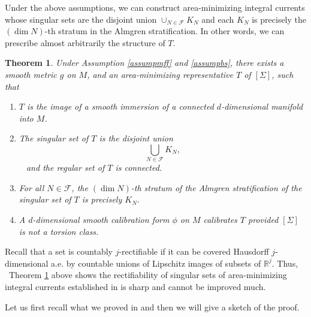 \documentclass[11pt,a4paper]{amsart}
\numberwithin{equation}{section}
\newcommand{\mff}{\mathcal{F}}
\newcommand{\Si}{\Sigma}
\newcommand{\R}{\mathbb{R}}
\theoremstyle{plain}
\newtheorem{thm}{Theorem}
\theoremstyle{definition}
\numberwithin{equation}{subsection}
\begin{document}
	Under the above assumptions, we can construct area-minimizing integral currents whose singular sets are the disjoint union $\cup_{N\in \mff}K_N$ and each $K_N$ is precisely the $(\dim N)$-th stratum in the Almgren stratification. In other words, we can prescribe almost arbitrarily the structure of $T.$ 
	\begin{thm}\label{thmi}Under Assumption \ref{assumpmff} and \ref{assumpbs}, there exists a smooth metric $g$ on $M$, and an area-minimizing representative $T$ of $[\Si]$, such that
		\begin{enumerate}
			\item $T$ is the image of a smooth immersion of a connected $d$-dimensional manifold into $M$. %
			\item The singular set of $T$ is the disjoint union $$\bigcup_{N\in\mff}K_N,$$   and the regular set of $T$ is connected.
			\item For all $N\in \mff $, the $(\dim N)$-th stratum of the Almgren stratification of the singular set of $T$ is precisely $K_N.$
			\item A $d$-dimensional smooth calibration form $\phi$ on $M$ calibrates $T$ provided $[\Si]$ is not a torsion class.
		\end{enumerate} 
	\end{thm}
	Recall that a set is countably $j$-rectifiable if it can be covered Hausdorff $j$-dimensional a.e. by countable unions of Lipschitz images of subsets of $\R^j.$ Thus,  Theorem \ref{thmi} above shows the rectifiability of singular sets of area-minimizing integral currents established in \cite{DMS1,DMS2,DMS3,BK1,BK2,BK3} is sharp and cannot be improved much.
	
	Let us first recall what we proved in \cite{ZLa} and then we will give a sketch of the proof.
\end{document}
